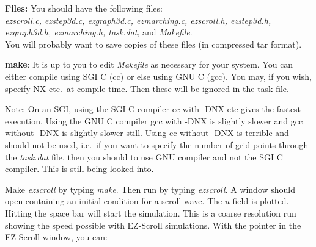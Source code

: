 {\bf Files:} You should have the following files: \\ {\em ezscroll.c,
ezstep3d.c, ezgraph3d.c, ezmarching.c, ezscroll.h, ezstep3d.h,
ezgraph3d.h, ezmarching.h, task.dat}, and {\em Makefile}. \\ You will
probably want to save copies of these files (in compressed tar
format).

{\bf make}: It is up to you to edit {\em Makefile} as necessary for
your system. You can either compile using SGI C (cc) or else using GNU
C (gcc).  You may, if you wish, specify NX etc.~at compile time.  Then
these will be ignored in the task file.

Note: On an SGI, using the SGI C compiler cc with -DNX etc gives the
fastest execution.  Using the GNU C compiler gcc with -DNX is slightly
slower and gcc without -DNX is slightly slower still.  Using cc
without -DNX is terrible and should not be used, i.e.~if you want to
specify the number of grid points through the {\em task.dat} file,
then you should to use GNU compiler and not the SGI C compiler.  This
is still being looked into.

Make {\em ezscroll} by typing {\em make}. Then run by typing {\em
ezscroll}. A window should open containing an initial condition for a
scroll wave. The $u$-field is plotted.  Hitting the space bar will
start the simulation. This is a coarse resolution run showing the
speed possible with EZ-Scroll simulations.  With the pointer in the
EZ-Scroll window, you can:

